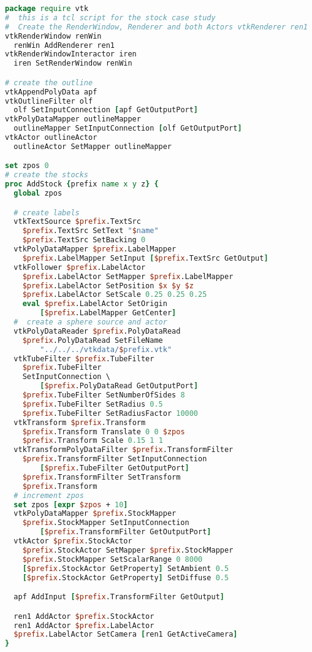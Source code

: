 \begin{lstlisting}[language=TCL, caption={Tcl script for stock case study.}]
package require vtk
#  this is a tcl script for the stock case study
#  Create the RenderWindow, Renderer and both Actors vtkRenderer ren1
vtkRenderWindow renWin
  renWin AddRenderer ren1
vtkRenderWindowInteractor iren
  iren SetRenderWindow renWin

# create the outline
vtkAppendPolyData apf
vtkOutlineFilter olf
  olf SetInputConnection [apf GetOutputPort]
vtkPolyDataMapper outlineMapper
  outlineMapper SetInputConnection [olf GetOutputPort]
vtkActor outlineActor
  outlineActor SetMapper outlineMapper

set zpos 0
# create the stocks
proc AddStock {prefix name x y z} {
  global zpos

  # create labels
  vtkTextSource $prefix.TextSrc
    $prefix.TextSrc SetText "$name"
    $prefix.TextSrc SetBacking 0
  vtkPolyDataMapper $prefix.LabelMapper
    $prefix.LabelMapper SetInput [$prefix.TextSrc GetOutput]
  vtkFollower $prefix.LabelActor
    $prefix.LabelActor SetMapper $prefix.LabelMapper
    $prefix.LabelActor SetPosition $x $y $z
    $prefix.LabelActor SetScale 0.25 0.25 0.25
    eval $prefix.LabelActor SetOrigin
        [$prefix.LabelMapper GetCenter]
  #  create a sphere source and actor
  vtkPolyDataReader $prefix.PolyDataRead
    $prefix.PolyDataRead SetFileName
		"../../../vtkdata/$prefix.vtk"
  vtkTubeFilter $prefix.TubeFilter
    $prefix.TubeFilter
    SetInputConnection \
        [$prefix.PolyDataRead GetOutputPort]
	$prefix.TubeFilter SetNumberOfSides 8
	$prefix.TubeFilter SetRadius 0.5
    $prefix.TubeFilter SetRadiusFactor 10000
  vtkTransform $prefix.Transform
	$prefix.Transform Translate 0 0 $zpos
	$prefix.Transform Scale 0.15 1 1
  vtkTransformPolyDataFilter $prefix.TransformFilter
    $prefix.TransformFilter SetInputConnection
        [$prefix.TubeFilter GetOutputPort]
    $prefix.TransformFilter SetTransform
    $prefix.Transform
  # increment zpos
  set zpos [expr $zpos + 10]
  vtkPolyDataMapper $prefix.StockMapper
    $prefix.StockMapper SetInputConnection
        [$prefix.TransformFilter GetOutputPort]
  vtkActor $prefix.StockActor
    $prefix.StockActor SetMapper $prefix.StockMapper
    $prefix.StockMapper SetScalarRange 0 8000
    [$prefix.StockActor GetProperty] SetAmbient 0.5
    [$prefix.StockActor GetProperty] SetDiffuse 0.5

  apf AddInput [$prefix.TransformFilter GetOutput]

  ren1 AddActor $prefix.StockActor
  ren1 AddActor $prefix.LabelActor
  $prefix.LabelActor SetCamera [ren1 GetActiveCamera]
}


\end{lstlisting}
